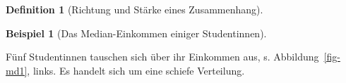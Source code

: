 \documentclass[
  a4paper,
  DIV=11]{scrreprt}
\theoremstyle{definition}
\theoremstyle{definition}
\newtheorem{example}{Beispiel}[chapter]
\theoremstyle{definition}
\newtheorem{definition}{Definition}[chapter]
\theoremstyle{remark}
\begin{document}
\begin{definition}[Richtung und Stärke eines
Zusammenhang]
\begin{tcolorbox}
\end{tcolorbox}

\begin{example}[Das Median-Einkommen einiger
Studentinnen]\protect\hypertarget{exm-med}{}\label{exm-med}

Fünf Studentinnen tauschen sich über ihr Einkommen aus, s.
Abbildung~\ref{fig-md1}, links. Es handelt sich um eine schiefe
Verteilung.

\begin{figure}

\begin{minipage}{\linewidth}



\end{minipage}%
\newline
\begin{minipage}{\linewidth}

\end{minipage}
\end{figure}
\end{example}
\end{definition}
\end{document}
